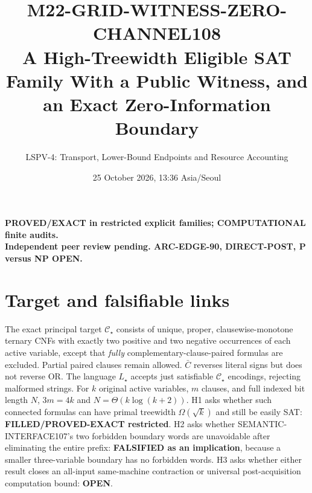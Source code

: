 \documentclass[11pt]{article}
\title{M22-GRID-WITNESS-ZERO-CHANNEL108\\ \large A High-Treewidth Eligible SAT Family With a Public Witness, and an Exact Zero-Information Boundary}
\author{LSPV-4: Transport, Lower-Bound Endpoints and Resource Accounting}
\date{25 October 2026, 13:36 Asia/Seoul}
\newcommand{\CS}{\mathcal C_\star}
\begin{document}
\maketitle
\begin{center}
\textbf{PROVED/EXACT in restricted explicit families; COMPUTATIONAL finite audits.}\\
\textbf{Independent peer review pending. ARC-EDGE-90, DIRECT-POST, P versus NP OPEN.}
\end{center}
\section{Target and falsifiable links}
The exact principal target $\CS$ consists of unique, proper, clausewise-monotone ternary CNFs with exactly two positive and two negative occurrences of each active variable, except that \emph{fully} complementary-clause-paired formulas are excluded. Partial paired clauses remain allowed. $\bar C$ reverses literal signs but does not reverse OR. The language $L_\star$ accepts just satisfiable $\CS$ encodings, rejecting malformed strings. For $k$ original active variables, $m$ clauses, and full indexed bit length $N$, $3m=4k$ and $N=\Theta(k\log(k+2))$.
H1 asks whether such connected formulas can have primal treewidth $\Omega(\sqrt{k})$ and still be easily SAT: \textbf{FILLED/PROVED-EXACT restricted}. H2 asks whether SEMANTIC-INTERFACE107's two forbidden boundary words are unavoidable after eliminating the entire prefix: \textbf{FALSIFIED as an implication}, because a smaller three-variable boundary has no forbidden words. H3 asks whether either result closes an all-input same-machine contraction or universal post-acquisition computation bound: \textbf{OPEN}.
\end{document}
